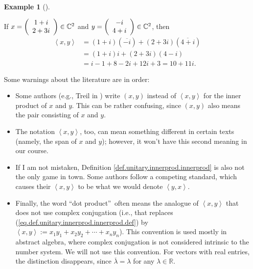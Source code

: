 \documentclass[numbers=enddot,12pt,final,onecolumn,notitlepage]{scrartcl}%
\numberwithin{exer}{subsection}
\theoremstyle{definition}
\newtheorem{exam}[theo]{Example}
\newenvironment{example}[1][]
{\begin{exam}[#1]\begin{leftbar}}
{\end{leftbar}\end{exam}}
\begin{document}
\begin{example}
If $x=\left(
\begin{array}
[c]{c}%
1+i\\
2+3i
\end{array}
\right)  \in\mathbb{C}^{2}$ and $y=\left(
\begin{array}
[c]{c}%
-i\\
4+i
\end{array}
\right)  \in\mathbb{C}^{2}$, then%
\begin{align*}
\left\langle x,y\right\rangle  &  =\left(  1+i\right)  \left(  \overline
{-i}\right)  +\left(  2+3i\right)  \left(  \overline{4+i}\right) \\
&  =\left(  1+i\right)  i+\left(  2+3i\right)  \left(  4-i\right) \\
&  =i-1+8-2i+12i+3=10+11i.
\end{align*}

\end{example}

Some warnings about the literature are in order:

\begin{itemize}
\item Some authors (e.g., Treil in \cite{Treil15}) write $\left(  x,y\right)
$ instead of $\left\langle x,y\right\rangle $ for the inner product of $x$ and
$y$. This can be rather confusing, since $\left(  x,y\right)  $ also means the
pair consisting of $x$ and $y$.

\item The notation $\left\langle x,y\right\rangle $, too, can mean something
different in certain texts (namely, the span of $x$ and $y$); however, it
won't have this second meaning in our course.

\item If I am not mistaken, Definition \ref{def.unitary.innerprod.innerprod}
is also not the only game in town. Some authors follow a competing standard,
which causes their $\left\langle x,y\right\rangle $ to be what we would denote
$\left\langle y,x\right\rangle $.

\item Finally, the word \textquotedblleft dot product\textquotedblright\ often
means the analogue of $\left\langle x,y\right\rangle $ that does not use
complex conjugation (i.e., that replaces
(\ref{eq.def.unitary.innerprod.innerprod.def}) by $\left\langle
x,y\right\rangle :=x_{1}y_{1}+x_{2}y_{2}+\cdots+x_{n}y_{n}$). This convention
is used mostly in abstract algebra, where complex conjugation is not
considered intrinsic to the number system. We will not use this convention.
For vectors with real entries, the distinction disappears, since
$\overline{\lambda}=\lambda$ for any $\lambda\in\mathbb{R}$.
\end{itemize}
\end{document}
